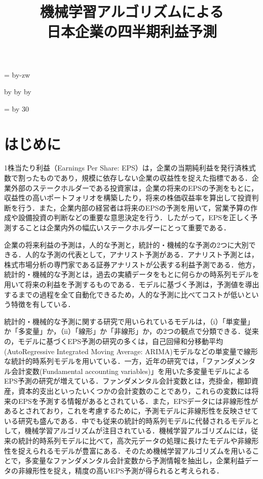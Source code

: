\documentclass[a4paper，11pt]{jsarticle}
\title{機械学習アルゴリズムによる\\
  日本企業の四半期利益予測}
\date{}
\makeatletter
\def\mojiparline#1{
    \newcounter{mpl}
    \setcounter{mpl}{#1}
    \@tempdima=\linewidth
    \advance\@tempdima by-\value{mpl}zw
    \addtocounter{mpl}{-1}
    \divide\@tempdima by \value{mpl}
    \advance\kanjiskip by\@tempdima
    \advance\parindent by\@tempdima
}
\def\linesparpage#1{
    \baselineskip=\textheight
    \divide\baselineskip by #1
}
\makeatother
\begin{document}
\mojiparline{40}
\linesparpage{30}

\tableofcontents
\newpage

\maketitle
\part{はじめに}

1株当たり利益（Earnings Per Share: EPS）は，企業の当期純利益を発行済株式数で割ったものであり，規模に依存しない企業の収益性を捉えた指標である．企業外部のステークホルダーである投資家は，企業の将来のEPSの予測をもとに，収益性の高いポートフォリオを構築したり，将来の株価収益率を算出して投資判断を行う．また，企業内部の経営者は将来のEPSの予測を用いて，営業予算の作成や設備投資の判断などの重要な意思決定を行う．したがって，EPSを正しく予測することは企業内外の幅広いステークホルダーにとって重要である．

企業の将来利益の予測は，人的な予測と，統計的・機械的な予測の2つに大別できる．人的な予測の代表として，アナリスト予測がある．アナリスト予測とは，株式市場分析の専門家である証券アナリストが公表する利益予測である．他方，統計的・機械的な予測とは，過去の実績データをもとに何らかの時系列モデルを用いて将来の利益を予測するものである．モデルに基づく予測は，予測値を導出するまでの過程を全て自動化できるため，人的な予測に比べてコストが低いという特徴を有している\citep{sakurai1990}．

統計的・機械的な予測に関する研究で用いられているモデルは，（i）「単変量」か「多変量」か，（ii）「線形」か「非線形」か，の2つの観点で分類できる\citep{zhang2004neural}．従来の，モデルに基づくEPS予測の研究の多くは，自己回帰和分移動平均(AutoRegressive Integrated Moving Average: ARIMA)モデル\citep{box2015time}などの単変量で線形な統計的時系列モデルを用いている．一方，近年の研究では，「ファンダメンタル会計変数(Fundamental accounting variables)」を用いた多変量モデルによるEPS予測の研究が増えている．ファンダメンタル会計変数とは，売掛金，棚卸資産，資本的支出といったいくつかの会計変数のことであり，これらの変数には将来のEPSを予測する情報があるとされている\citep*{lev1993fundamental, abarbanell1997fundamental}．また，EPSデータには非線形性があるとされており\citep*{hopwood1986univariate}，これを考慮するために，予測モデルに非線形性を反映させている研究も盛んである．中でも従来の統計的時系列モデルに代替されるモデルとして，機械学習アルゴリズムが注目されている．機械学習アルゴリズムには，従来の統計的時系列モデルに比べて，高次元データの処理に長けたモデルや非線形性を捉えられるモデルが豊富にある\citep*{cao2020fundamental}．そのため機械学習アルゴリズムを用いることで，多変量なファンダメンタル会計変数から予測情報を抽出し，企業利益データの非線形性を捉え，精度の高いEPS予測が得られると考えられる．
\end{document}
